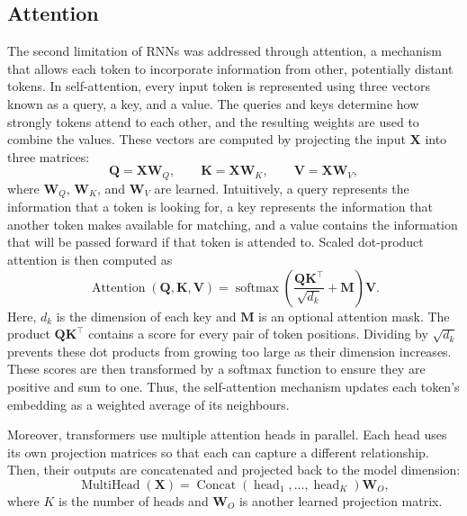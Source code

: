\subsection{Attention}

The second limitation of RNNs was addressed through attention, a mechanism that allows each token to incorporate information from other, potentially distant tokens. In self-attention, every input token is represented using three vectors known as a query, a key, and a value. The queries and keys determine how strongly tokens attend to each other, and the resulting weights are used to combine the values. These vectors are computed by projecting the input $\mathbf{X}$ into three matrices:
\begin{equation}
    \mathbf{Q}=\mathbf{X}\mathbf{W}_{Q}, \qquad
    \mathbf{K}=\mathbf{X}\mathbf{W}_{K}, \qquad
    \mathbf{V}=\mathbf{X}\mathbf{W}_{V},
    \label{eq:qkv_projections}
\end{equation}
where $\mathbf{W}_{Q}$, $\mathbf{W}_{K}$, and $\mathbf{W}_{V}$ are learned. Intuitively, a query represents the information that a token is looking for, a key represents the information that another token makes available for matching, and a value contains the information that will be passed forward if that token is attended to. Scaled dot-product attention is then computed as
\begin{equation}
    \operatorname{Attention}(\mathbf{Q},\mathbf{K},\mathbf{V})
    = \operatorname{softmax}\!\left(
        \frac{\mathbf{Q}\mathbf{K}^{\top}}{\sqrt{d_k}} + \mathbf{M}
      \right)\mathbf{V}.
    \label{eq:scaled_dot_product_attention}
\end{equation}
Here, $d_k$ is the dimension of each key and $\mathbf{M}$ is an optional attention mask. The product $\mathbf{Q}\mathbf{K}^{\top}$ contains a score for every pair of token positions. Dividing by $\sqrt{d_k}$ prevents these dot products from growing too large as their dimension increases. These scores are then transformed by a softmax function to ensure they are positive and sum to one. Thus, the self-attention mechanism updates each token's embedding as a weighted average of its neighbours.

Moreover, transformers use multiple attention heads in parallel. Each head uses its own projection matrices so that each can capture a different relationship. Then, their outputs are concatenated and projected back to the model dimension:
\begin{equation}
    \operatorname{MultiHead}(\mathbf{X})
    = \operatorname{Concat}(\operatorname{head}_1,\ldots,
      \operatorname{head}_K)\mathbf{W}_{O},
    \label{eq:multi_head_attention}
\end{equation}
where $K$ is the number of heads and $\mathbf{W}_{O}$ is another learned projection matrix.

